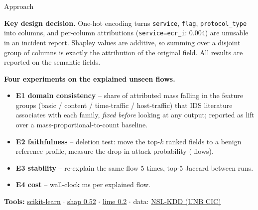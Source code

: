 \documentclass[10pt,aspectratio=169]{beamer}
\newcommand{\f}[1]{{\small\texttt{#1}}}
\newcommand{\link}[2]{\href{#1}{\color{accent}\underline{#2}}}
\begin{document}
\begin{frame}{Approach}
\centering
{}

\vspace{0.6em}
\raggedright\scriptsize
\textbf{Key design decision.} One-hot encoding turns \f{service}, \f{flag},
\f{protocol\_type} into \nCols{} columns, and per-column attributions
(\f{service=ecr\_i}: 0.004) are unusable in an incident report. Shapley values
are additive, so summing over a disjoint group of columns is exactly the
attribution of the original field. All results are reported on the
\nFields{} semantic fields.

\vspace{0.5em}
\textbf{Four experiments on the \nExplained{} explained unseen flows.}
\begin{itemize}\itemsep1pt
  \item \textbf{E1 domain consistency} -- share of attributed mass falling in the
        feature groups (basic / content / time-traffic / host-traffic) that IDS
        literature associates with each family, \emph{fixed before} looking at any output;
        reported as lift over a mass-proportional-to-count baseline.
  \item \textbf{E2 faithfulness} -- deletion test: move the top-$k$ ranked fields to a
        benign reference profile, measure the drop in attack probability (\nFaith{} flows).
  \item \textbf{E3 stability} -- re-explain the same flow 5 times, top-5 Jaccard between runs.
  \item \textbf{E4 cost} -- wall-clock ms per explained flow.
\end{itemize}
\vspace{0.3em}
\textbf{Tools:} \link{https://scikit-learn.org/}{scikit-learn} $\cdot$
\link{https://github.com/shap/shap}{shap 0.52} $\cdot$
\link{https://github.com/marcotcr/lime}{lime 0.2} $\cdot$
data: \link{https://www.unb.ca/cic/datasets/nsl.html}{NSL-KDD (UNB CIC)}
\end{frame}
\end{document}
